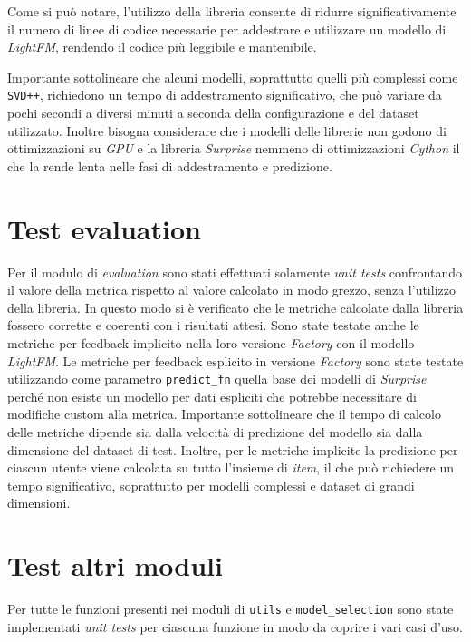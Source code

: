 Come si può notare, l'utilizzo della libreria consente di ridurre significativamente il numero di linee di codice necessarie per addestrare e utilizzare un modello di \textit{LightFM}, rendendo il codice più leggibile e mantenibile.

Importante sottolineare che alcuni modelli, soprattutto quelli più complessi come \texttt{SVD++}, richiedono un tempo di addestramento significativo, che può variare da pochi secondi a diversi minuti a seconda della configurazione e del dataset utilizzato. Inoltre bisogna considerare che i modelli delle librerie non godono di ottimizzazioni su \textit{GPU} e la libreria \textit{Surprise} nemmeno di ottimizzazioni \textit{Cython} il che la rende lenta nelle fasi di addestramento e predizione. 

\section{Test evaluation}

Per il modulo di \textit{evaluation} sono stati effettuati solamente \textit{unit tests} confrontando il valore della metrica rispetto al valore calcolato in modo grezzo, senza l'utilizzo della libreria. In questo modo si è verificato che le metriche calcolate dalla libreria fossero corrette e coerenti con i risultati attesi. Sono state testate anche le metriche per feedback implicito nella loro versione \textit{Factory} con il modello \textit{LightFM}. Le metriche per feedback esplicito in versione \textit{Factory} sono state testate utilizzando come parametro \texttt{predict\_fn} quella base dei modelli di \textit{Surprise} perché non esiste un modello per dati espliciti che potrebbe necessitare di modifiche custom alla metrica. Importante sottolineare che il tempo di calcolo delle metriche dipende sia dalla velocità di predizione del modello sia dalla dimensione del dataset di test. Inoltre, per le metriche implicite la predizione per ciascun utente viene calcolata su tutto l'insieme di \textit{item}, il che può richiedere un tempo significativo, soprattutto per modelli complessi e dataset di grandi dimensioni.

\section{Test altri moduli}
Per tutte le funzioni presenti nei moduli di \texttt{utils} e \texttt{model\_selection} sono state implementati \textit{unit tests} per ciascuna funzione in modo da coprire i vari casi d'uso.

